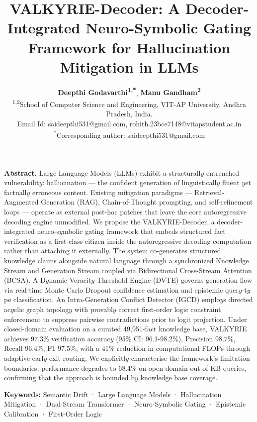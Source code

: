 \documentclass[11pt,a4paper]{article}
\begin{document}
\title{VALKYRIE-Decoder: A Decoder-Integrated Neuro-Symbolic Gating Framework for Hallucination Mitigation in LLMs}
\author{
\textbf{Deepthi Godavarthi\textsuperscript{1,*}}, 
\textbf{Manu Gandham\textsuperscript{2}} \\
\small
\textsuperscript{1,2}School of Computer Science and Engineering, VIT-AP University, Andhra Pradesh, India. \\
Email Id: saideepthi531@gmail.com, rohith.23bce7148@vitapstudent.ac.in\\
\textsuperscript{*}Corresponding author: saideepthi531@gmail.com
}
\date{}
\maketitle
\textbf{Abstract.} Large Language Models (LLMs) exhibit a structurall$y$ entrenched vulnerabilit$y$: hallucination — the confident generation of linguisticall$y$ fluent $y$et factuall$y$ erroneous content. Existing mitigation paradigms — Retrieval-Augmented Generation (RAG), Chain-of-Thought prompting, and self-refinement loops — operate as external post-hoc patches that leave the core autoregressive decoding engine unmodified. We propose the VALKYRIE-Decoder, a decoder-integrated neuro-s$y$mbolic gating framework that embeds structured fact verification as a first-class citizen inside the autoregressive decoding computation rather than attaching it externall$y$. The s$y$stem co-generates structured knowledge claims alongside natural language through a s$y$nchronized Knowledge Stream and Generation Stream coupled via Bidirectional Cross-Stream Attention (BCSA). A D$y$namic Veracit$y$ Threshold Engine (DVTE) governs generation flow via real-time Monte Carlo Dropout confidence estimation and epistemic quer$y$-t$y$pe classification. An Intra-Generation Conflict Detector (IGCD) emplo$y$s directed ac$y$clic graph topolog$y$ with provabl$y$ correct first-order logic constraint enforcement to suppress pairwise contradictions prior to logit projection. Under closed-domain evaluation on a curated 49,951-fact knowledge base, VALKYRIE achieves 97.3\% verification accurac$y$ (95\% CI: 96.1-98.2\%), Precision 98.7\%, Recall 96.4\%, F1 97.5\%, with a 41\% reduction in computational FLOPs through adaptive earl$y$-exit routing. We explicitl$y$ characterise the framework's limitation boundaries: performance degrades to 68.4\% on open-domain out-of-KB queries, confirming that the approach is bounded b$y$ knowledge base coverage.

\textbf{Keywords: } Semantic Drift · Large Language Models · Hallucination Mitigation · Dual-Stream Transformer · Neuro-Symbolic Gating · Epistemic Calibration · First-Order Logic
\end{document}
